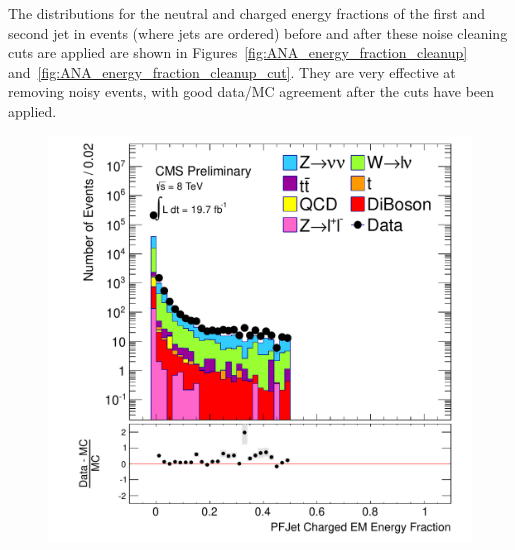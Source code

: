The distributions for the neutral and charged energy fractions of the first and second jet in events (where jets are \pt{} ordered) before and after these noise cleaning cuts are applied are shown in Figures~\ref{fig:ANA_energy_fraction_cleanup} and~\ref{fig:ANA_energy_fraction_cleanup_cut}. 
They are very effective at removing noisy events, with good data/MC agreement after the cuts have been applied.


\begin{figure}[!Hhtb]%
  \begin{center}
  \includegraphics[scale=0.31]     {Figures/sus13009/nocut/prelimLabels/PFAK5JetChaEmEngFrac.pdf}

\end{center}
\end{figure}
